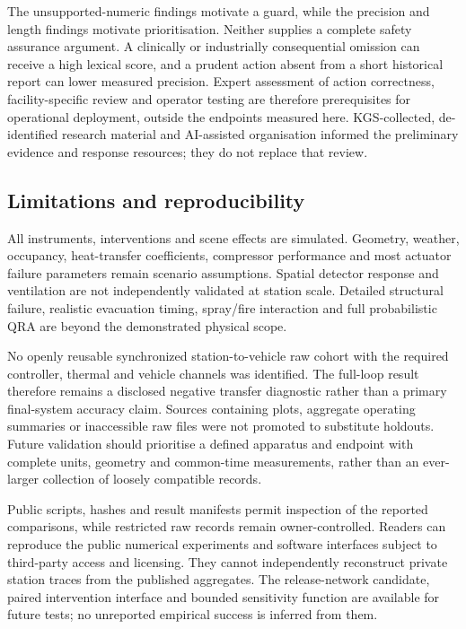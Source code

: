 \documentclass[12pt,a4paper]{article}
\begin{document}
The unsupported-numeric findings motivate a guard, while the precision and
length findings motivate prioritisation. Neither supplies a complete safety
assurance argument. A clinically or industrially consequential omission can
receive a high lexical score, and a prudent action absent from a short
historical report can lower measured precision. Expert assessment of action
correctness, facility-specific review and operator testing are therefore
prerequisites for operational deployment, outside the endpoints measured here.
KGS-collected, de-identified research material and AI-assisted organisation
informed the preliminary evidence and response resources; they do not replace
that review.

\subsection{Limitations and reproducibility}
All instruments, interventions and scene effects are simulated. Geometry,
weather, occupancy, heat-transfer coefficients, compressor performance and
most actuator failure parameters remain scenario assumptions. Spatial detector
response and ventilation are not independently validated at station scale.
Detailed structural failure, realistic evacuation timing, spray/fire interaction
and full probabilistic QRA are beyond the demonstrated physical scope.

No openly reusable synchronized station-to-vehicle raw cohort with the required
controller, thermal and vehicle channels was identified. The full-loop result
therefore remains a disclosed negative transfer diagnostic rather than a
primary final-system accuracy claim. Sources containing plots, aggregate
operating summaries or inaccessible raw files were not promoted to substitute
holdouts. Future validation should prioritise a defined apparatus and endpoint
with complete units, geometry and common-time measurements, rather than an
ever-larger collection of loosely compatible records.

Public scripts, hashes and result manifests permit inspection of the reported
comparisons, while restricted raw records remain owner-controlled. Readers can
reproduce the public numerical experiments and software interfaces subject to
third-party access and licensing. They cannot independently reconstruct private
station traces from the published aggregates. The release-network candidate,
paired intervention interface and bounded sensitivity function are available
for future tests; no unreported empirical success is inferred from them.
\end{document}
